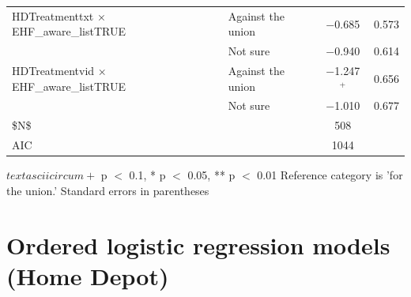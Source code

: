 \documentclass[
  11pt,
  oneside]{article}
\begin{document}
\begin{table}
\begin{threeparttable}
\begin{tabular}[t]{llcc}
HDTreatmenttxt × EHF\_aware\_listTRUE & Against the union & \num{-0.685} & \num{0.573}\\
 & Not sure & \num{-0.940} & \num{0.614}\\
HDTreatmentvid × EHF\_aware\_listTRUE & Against the union & \num{-1.247}$^+$ & \num{0.656}\\
 & Not sure & \num{-1.010} & \num{0.677}\\
\midrule
\$N\$ &  & \num{508} & \\
AIC &  & \num{1044} & \\
\bottomrule
\end{tabular}
\begin{tablenotes}
\item $textasciicircum{}+$ p $<$ 0.1, * p $<$ 0.05, ** p $<$ 0.01 Reference category is 'for the union.' Standard errors in parentheses
\end{tablenotes}
\end{threeparttable}
\end{table}

\newpage

\section{Ordered logistic regression models (Home Depot)}\label{app-ol}
\end{document}
